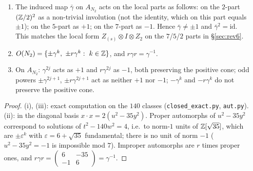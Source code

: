 \begin{proposition}\label{prop:gamma8}
\begin{enumerate}[label=(\roman*)]
\item The induced map $\bar\gamma$ on $A_{N_2}$ acts on the local parts as follows: on the $2$-part $(\mathbb{Z}/2)^2$ as a non-trivial involution (not the identity, which on this part equals $\pm1$); on the $5$-part as $+1$; on the $7$-part as $-1$. Hence $\bar\gamma\neq\pm1$ and $\bar\gamma^2=\mathrm{id}$. This matches the local form $Z_{(s)}\otimes I\otimes Z_2$ on the $7$/$5$/$2$ parts in \S\ref{sec:rev6}.
\item $O(N_2)=\{\pm\gamma^k,\ \pm r\gamma^k:\ k\in\Z\}$, and $r\gamma r=\gamma^{-1}$.
\item On $A_{N_2}$: $\gamma^{2j}$ acts as $+1$ and $r\gamma^{2j}$ as $-1$, both preserving the positive cone; odd powers $\pm\gamma^{2j+1}$, $\pm r\gamma^{2j+1}$ act as neither $+1$ nor $-1$; $-\gamma^{k}$ and $-r\gamma^k$ do not preserve the positive cone.
\end{enumerate}
\end{proposition}
\begin{proof}
(i), (iii): exact computation on the $140$ classes (\texttt{closed\_exact.py}, \texttt{aut.py}). (ii): in the diagonal basis $x\cdot x=2(u^2-35y^2)$. Proper automorphs of $u^2-35y^2$ correspond to solutions of $t^2-140w^2=4$, i.e.\ to norm-$1$ units of $\mathbb{Z}[\sqrt{35}]$, which are $\pm\varepsilon^k$ with $\varepsilon=6+\sqrt{35}$ fundamental; there is no unit of norm $-1$ ($u^2-35y^2=-1$ is impossible mod $7$). Improper automorphs are $r$ times proper ones, and $r\gamma r=\left(\begin{smallmatrix}6&-35\\-1&6\end{smallmatrix}\right)=\gamma^{-1}$.
\end{proof}


